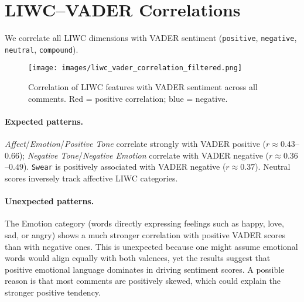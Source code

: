 \section{LIWC--VADER Correlations}
\label{subsec:results_liwc_vader}

We correlate all LIWC dimensions with VADER sentiment (\texttt{positive}, \texttt{negative},
\texttt{neutral}, \texttt{compound}).

\begin{figure}[H]
    \centering
    \texttt{[image: images/liwc\_vader\_correlation\_filtered.png]}
    \caption{Correlation of LIWC features with VADER sentiment across all comments.
    Red = positive correlation; blue = negative.}
    \label{fig:liwc_vader_corr}
\end{figure}

\paragraph{Expected patterns.}
\textit{Affect}/\textit{Emotion}/\textit{Positive Tone} correlate strongly with VADER positive
($r \approx 0.43$--$0.66$); \textit{Negative Tone}/\textit{Negative Emotion} correlate with
VADER negative ($r \approx 0.36$--$0.49$). \texttt{Swear} is positively associated with
VADER negative ($r \approx 0.37$). Neutral scores inversely track affective LIWC categories.

\paragraph{Unexpected patterns.}
The Emotion category (words directly expressing feelings such as happy, love, sad, or angry) shows a much stronger correlation with positive VADER scores than with negative ones. This is unexpected because one might assume emotional words would align equally with both valences, yet the results suggest that positive emotional language dominates in driving sentiment scores. A possible reason is that most comments are positively skewed, which could explain the stronger positive tendency.

